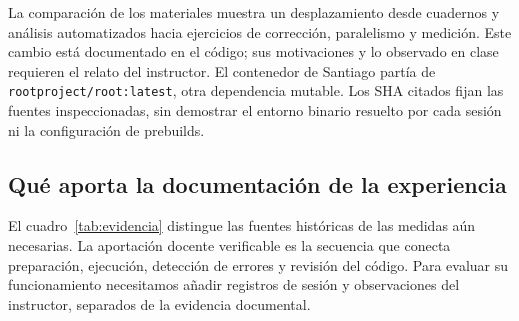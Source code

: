 La comparación de los materiales muestra un desplazamiento desde cuadernos y análisis automatizados hacia ejercicios de corrección, paralelismo y medición. Este cambio está documentado en el código; sus motivaciones y lo observado en clase requieren el relato del instructor. El contenedor de Santiago partía de \texttt{rootproject/root:latest}, otra dependencia mutable. Los SHA citados fijan las fuentes inspeccionadas, sin demostrar el entorno binario resuelto por cada sesión ni la configuración de prebuilds.

\subsection{Qué aporta la documentación de la experiencia}
El cuadro~\ref{tab:evidencia} distingue las fuentes históricas de las medidas aún necesarias. La aportación docente verificable es la secuencia que conecta preparación, ejecución, detección de errores y revisión del código. Para evaluar su funcionamiento necesitamos añadir registros de sesión y observaciones del instructor, separados de la evidencia documental.

